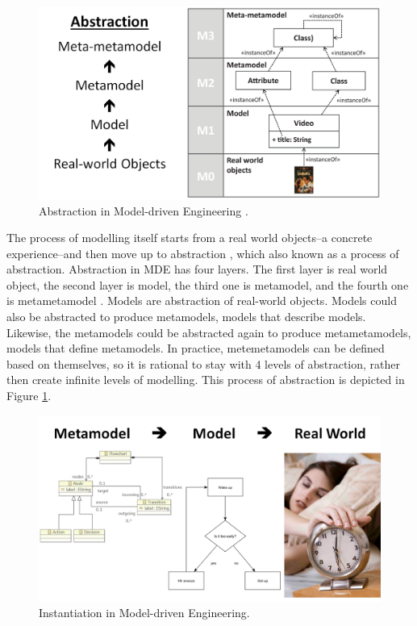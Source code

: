 \documentclass[12pt, a4paper]{report}
\begin{document}
\begin{figure}[!b]
\centering
\includegraphics[width=13cm]{abstraction}
\caption{Abstraction in Model-driven Engineering \cite{brambilla2012model}.}
\label{abstraction}
\end{figure}

The process of modelling itself starts from a real world objects--a concrete experience--and then move up to abstraction \cite{white2010teaching, engels2005teaching}, which also known as a process of abstraction. Abstraction in MDE has four layers. The first layer is real world object, the second layer is model, the third one is metamodel, and the fourth one is metametamodel \cite{brambilla2012model}. Models are abstraction of real-world objects. Models could also be abstracted to produce metamodels, models that describe models. Likewise, the metamodels could be abstracted again to produce metametamodels, models that define metamodels. In practice, metemetamodels can be defined based on themselves, so it is rational to stay with 4 levels of abstraction, rather then create infinite levels of modelling. This process of abstraction is depicted in Figure \ref{abstraction}.

\begin{figure}[!b]
\centering
\includegraphics[width=13cm]{concretisation}
\caption{Instantiation in Model-driven Engineering.}
\label{concretisation}
\end{figure}
 
\end{document}
